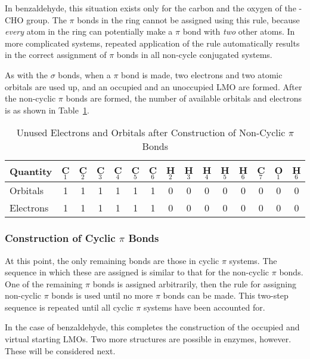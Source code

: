 In benzaldehyde, this situation exists only for the carbon and the oxygen of
the -CHO group.  The $\pi$ bonds in the ring cannot be assigned using this
rule, because {\em every} atom in the ring can potentially make a $\pi$ bond
with {\em two} other atoms.  In more complicated systems, repeated application 
of the rule automatically results in the correct assignment of $\pi$ bonds  in
all non-cycle conjugated systems.

As with the $\sigma$ bonds, when a $\pi$ bond is made, two electrons and two
atomic orbitals are used up, and an occupied and an unoccupied LMO are formed. 
After the non-cyclic $\pi$ bonds are formed, the number of available orbitals
and electrons is as shown in Table~\ref{after-pi}.

\begin{table}
\caption{\label{after-pi} Unused Electrons and Orbitals after Construction of 
Non-Cyclic $\pi$ Bonds}
\begin{center}
\begin{tabular}{lcccccccccccccc} \hline
Quantity & C$_1$ & C$_2$ & C$_3$ & C$_4$ & C$_5$ & C$_6$ & H$_2$ & H$_3$ & 
H$_4$ & H$_5$ & H$_6$ & C$_7$ & O$_1$ & H$_6$  \\ \hline 
Orbitals  & 1 &  1 & 1 & 1 & 1 & 1 & 0 & 0 &  0 &  0 &  0 &  0 & 0 & 0  \\ 
Electrons & 1 &  1 & 1 & 1 & 1 & 1 & 0 & 0 &  0 &  0 &  0 &  0 & 0 & 0  \\ 
\hline 
\end{tabular} 
\end{center}
\end{table} 

\subsubsection{Construction of Cyclic $\pi$ Bonds}
At this point, the only remaining bonds are those in cyclic $\pi$ systems. The
sequence in which these are assigned is similar to that for the non-cyclic
$\pi$ bonds.  One of the remaining $\pi$ bonds is assigned arbitrarily, then
the rule for assigning non-cyclic $\pi$ bonds is used until no more $\pi$ bonds
can be made.  This two-step sequence is repeated until all cyclic $\pi$ systems
have been accounted for.

In the case of benzaldehyde, this completes the construction of the occupied
and virtual starting LMOs.  Two more structures are possible in enzymes,
however.  These will be considered next.

